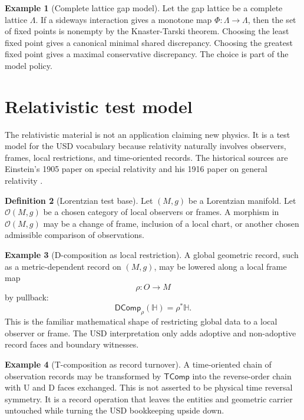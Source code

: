 \documentclass[11pt]{article}
\newcommand{\DComp}{\mathsf{DComp}}
\newcommand{\TComp}{\mathsf{TComp}}
\theoremstyle{definition}
\newtheorem{definition}{Definition}[section]
\newtheorem{example}[definition]{Example}
\theoremstyle{plain}
\begin{document}
\begin{example}[Complete lattice gap model]
Let the gap lattice be a complete lattice $\Lambda$.  If a sideways
interaction gives a monotone map $\Phi:\Lambda\to\Lambda$, then the set
of fixed points is nonempty by the Knaster-Tarski theorem.  Choosing the
least fixed point gives a canonical minimal shared discrepancy.  Choosing
the greatest fixed point gives a maximal conservative discrepancy.  The
choice is part of the model policy.
\end{example}

\section{Relativistic test model}

The relativistic material is not an application claiming new physics.  It
is a test model for the USD vocabulary because relativity naturally
involves observers, frames, local restrictions, and time-oriented records.
The historical sources are Einstein's 1905 paper on special relativity
and his 1916 paper on general relativity \cite{Einstein1905,Einstein1916}.

\begin{definition}[Lorentzian test base]
Let $(M,g)$ be a Lorentzian manifold.  Let $\mathcal O(M,g)$ be a chosen
category of local observers or frames.  A morphism in $\mathcal O(M,g)$
may be a change of frame, inclusion of a local chart, or another chosen
admissible comparison of observations.
\end{definition}

\begin{example}[D-composition as local restriction]
A global geometric record, such as a metric-dependent record on $(M,g)$,
may be lowered along a local frame map
\[
  \rho:O\to M
\]
by pullback:
\[
  \DComp_{\rho}(\mathbb H)=\rho^*\mathbb H.
\]
This is the familiar mathematical shape of restricting global data to a
local observer or frame.  The USD interpretation only adds adoptive and
non-adoptive record faces and boundary witnesses.
\end{example}

\begin{example}[T-composition as record turnover]
A time-oriented chain of observation records may be transformed by
$\TComp$ into the reverse-order chain with U and D faces exchanged.  This
is not asserted to be physical time reversal symmetry.  It is a record
operation that leaves the entities and geometric carrier untouched while
turning the USD bookkeeping upside down.
\end{example}
\end{document}
